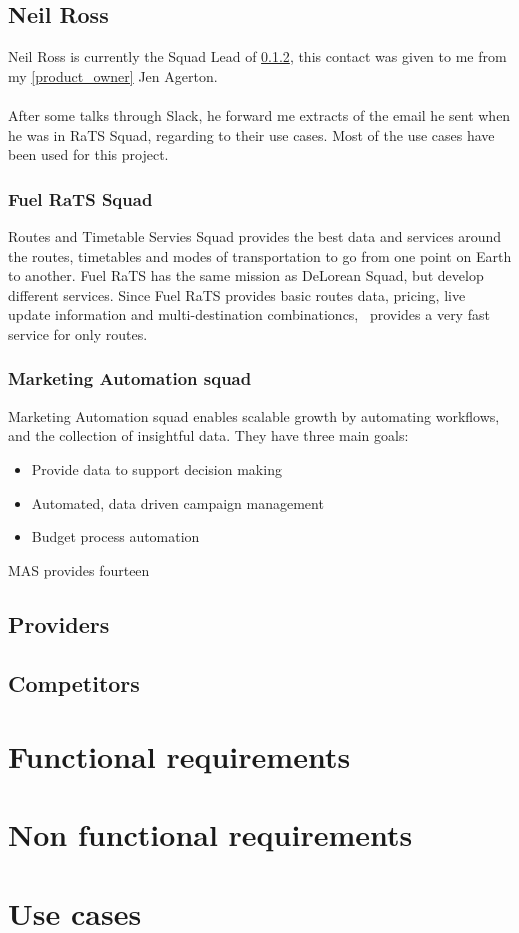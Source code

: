 \subsection{Neil Ross}

Neil Ross is currently the Squad Lead of \ref{marketing_atomation_squad}, this contact was given to me from my \ref{product_owner} Jen Agerton.
\\\\
After some talks through Slack\cite{slack}, he forward me extracts of the email he sent when he was in RaTS Squad, regarding to their use cases. Most of the use cases have been used for this project.

\subsubsection{Fuel RaTS Squad}

Routes and Timetable Servies Squad provides the best data and services around the routes, timetables and modes of transportation to go from one point on Earth to another. Fuel RaTS has the same mission as DeLorean Squad, but develop different services. Since Fuel RaTS provides basic routes data, pricing, live update information and multi-destination combinationcs, \squad\ provides a very fast service for only routes.

\subsubsection{Marketing Automation squad} \label{marketing_atomation_squad}

Marketing Automation squad enables scalable growth by automating workflows, and the collection of insightful data. They have three main goals:

\begin{itemize}
  \item Provide data to support decision making
  \item Automated, data driven campaign management
  \item Budget process automation
\end{itemize}

MAS provides fourteen 

\subsection{Providers}

\subsection{Competitors}

\section{Functional requirements}

\section{Non functional requirements}

\section{Use cases}

